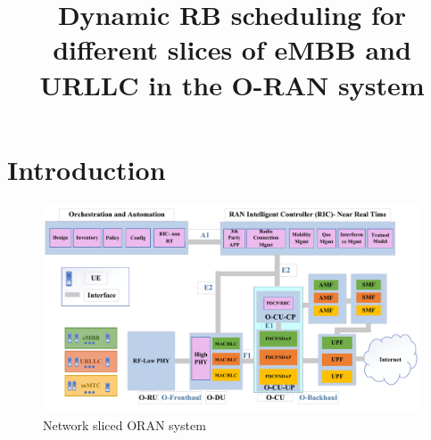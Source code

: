 \documentclass[conference]{IEEEtran}
\begin{document}
\title{Dynamic RB scheduling for different slices of eMBB and URLLC in the O-RAN system \vspace{-.1cm}
}
%

\maketitle

\begin{abstract}

\end{abstract}
\section{Introduction} 

\begin{figure}
  \centering 
    \includegraphics[scale = 0.5]{finalDraw.pdf}
  \caption{Network sliced ORAN system}
  \label{fig:1}
\end{figure}
\end{document}

